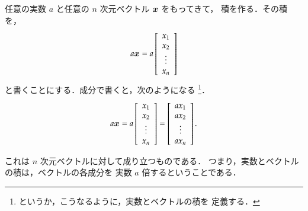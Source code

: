                 任意の実数 $a$ と任意の $n$ 次元ベクトル $\boldsymbol{x}$ をもってきて，
                積を作る．その積を，
                    \begin{equation*}
                        a\boldsymbol{x}
                        =
                        a\left[
                        \begin{array}{c}
                            x_{1}  \\
                            x_{2}  \\
                            \vdots \\
                            x_{n}  \\
                        \end{array}
                    \right]
                    \end{equation*}
                と書くことにする．成分で書くと，次のようになる
                    \footnote{
                        というか，こうなるように，実数とベクトルの積を
                        定義する．
                    }．
                \begin{align}
                    a\boldsymbol{x}
                    =
                    a\left[
                        \begin{array}{c}
                            x_{1}  \\
                            x_{2}  \\
                            \vdots \\
                            x_{n}  \\
                        \end{array}
                    \right]
                    =
                    \left[
                        \begin{array}{c}
                            ax_{1}  \\
                            ax_{2}  \\
                            \vdots \\
                            ax_{n}  \\
                        \end{array}
                    \right].
                \end{align}

                これは $n$ 次元ベクトルに対して成り立つものである．
                つまり，実数とベクトルの積は，ベクトルの各成分を
                実数 $a$ 倍するということである．

